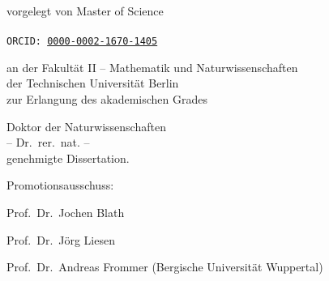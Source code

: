 \begin{titlepage}
  \null
  \vspace{1cm}
  \begin{center}
    \huge\sffamily\bfseries
    \doctitle
  \end{center}
  \begin{center}
    \Large\sffamily\bfseries
    \docsubtitle
  \end{center}
  \vspace{0.75cm}
  \begin{center}
    vorgelegt von Master of Science\\
    \medskip
    {\sffamily\bfseries\Large\docauthor}\\
    \medskip
    \texttt{ORCID: \href{https://orcid.org/0000-0002-1670-1405}{0000-0002-1670-1405}}
  \end{center}
  \vspace{0.75cm}
  \begin{center}
    an der Fakult\"at II -- Mathematik und Naturwissenschaften\\
    der Technischen Universit\"at Berlin\\
    zur Erlangung des akademischen Grades\\

    \medskip

    Doktor der Naturwissenschaften\\
    -- Dr.\ rer.\ nat. --\\

    \medskip
    genehmigte Dissertation.
  \end{center}
  \vspace{0.75cm}
  \begin{center}
    \begin{varwidth}{\textwidth}
      Promotionsausschuss: %
      \begin{description}[style=multiline,
                          leftmargin=3.5cm,font=\normalfont,noitemsep]
        \item[Vorsitzender:] Prof.\ Dr.\ Jochen Blath %
        \item[Gutachter:] Prof.\ Dr.\ J\"org Liesen %
        \item[Gutachter:] Prof.\ Dr.\ Andreas Frommer \hspace{0.1cm} (Bergische Universität Wuppertal)
      \end{description}


\end{varwidth}
\end{center}
\end{titlepage}
